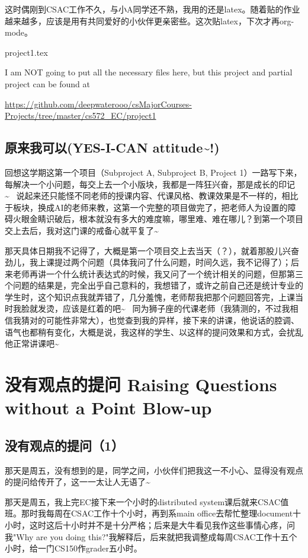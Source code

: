 \documentclass[12pt]{book}
\begin{document}
这时偶刚到CSAC工作不久，与小A同学还不熟，我用的还是latex。随着贴的作业越来越多，应该是用有共同爱好的小伙伴更亲密些。这次贴latex，下次才再org-mode。

project1.tex

I am NOT going to put all the necessary files here, but this project and partial project can be found at 

\url{https://github.com/deepwaterooo/csMajorCourses-Projects/tree/master/cs572_EC/project1}

\section{原来我可以(YES-I-CAN attitude\textasciitilde{}!)}
\label{sec-24-5}

回想这学期这第一个项目（Subproject A, Subproject B, Project 1）一路写下来，每解决一个小问题，每交上去一个小版块，我都是一阵狂兴奋，那是成长的印记\textasciitilde{}~ 说起来还只能怪不同老师的授课内容、代课风格、教课效果是不一样的，相比于板块，换成AI的老师来教，这第一个完整的项目做完了，把老师人为设置的障碍火眼金睛识破后，根本就没有多大的难度嘛，哪里难、难在哪儿？到第一个项目交上去后，我对这门课的戒备心就平复了\textasciitilde{}~

那天具体日期我不记得了，大概是第一个项目交上去当天（？），就着那股儿兴奋劲儿，我上课提过两个问题（具体我问了什么问题，时间久远，我不记得了）；后来老师再讲一个什么统计表达式的时候，我又问了一个统计相关的问题，但那第三个问题的结果是，完全出乎自己意料的，我想错了，或许之前自己还是统计专业的学生时，这个知识点我就弄错了，几分羞愧，老师帮我把那个问题回答完，上课当时我脸就发烫，应该是红着的吧\textasciitilde{}~ 同为狮子座的代课老师（我猜测的，不过我相信我猜对的可能性非常大），也觉查到我的异样，接下来的讲课，他说话的腔调、语气也都稍有变化，大概是说，我这样的学生、以这样的提问效果和方式，会扰乱他正常讲课吧\textasciitilde{}~

\chapter{没有观点的提问 Raising Questions without a Point Blow-up}
\label{sec-25}
\section{没有观点的提问（1）}
\label{sec-25-1}

那天是周五，没有想到的是，同学之间，小伙伴们把我这一不小心、显得没有观点的提问给传开了，这一一太让人无语了\textasciitilde{}~

那天是周五，我上完EC接下来一个小时的distributed system课后就来CSAC值班。那时我每周在CSAC工作十个小时，再到系main office去帮忙整理document十小时，这时这后十小时并不是十分严格；后来是大牛看见我作这些事情心疼，问我"Why are you doing this?"我解释后，后来就把我调整成每周CSAC工作十五个小时，给一门CS150作grader五小时。
\end{document}
